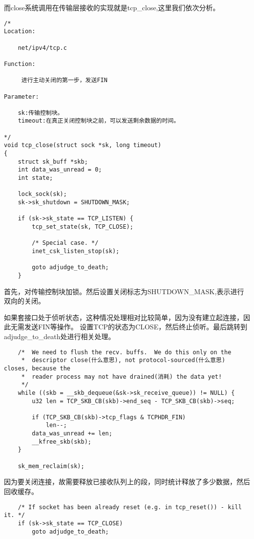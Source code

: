 			而close系统调用在传输层接收的实现就是tcp\_close,这里我们依次分析。
\begin{verbatim}
/*
Location:

    net/ipv4/tcp.c

Function:

     进行主动关闭的第一步，发送FIN   

Parameter:

    sk:传输控制块。
    timeout:在真正关闭控制块之前，可以发送剩余数据的时间。
    
*/
void tcp_close(struct sock *sk, long timeout)
{
    struct sk_buff *skb;
    int data_was_unread = 0;
    int state;

    lock_sock(sk);
    sk->sk_shutdown = SHUTDOWN_MASK;

    if (sk->sk_state == TCP_LISTEN) {
        tcp_set_state(sk, TCP_CLOSE);

        /* Special case. */
        inet_csk_listen_stop(sk);

        goto adjudge_to_death;
    }
\end{verbatim}

        首先，对传输控制块加锁。然后设置关闭标志为SHUTDOWN\_MASK,表示进行双向的关闭。

        如果套接口处于侦听状态，这种情况处理相对比较简单，因为没有建立起连接，因此无需发送FIN等操作。
		设置TCP的状态为CLOSE，然后终止侦听。最后跳转到adjudge\_to\_death处进行相关处理。

\begin{verbatim}
    /*  We need to flush the recv. buffs.  We do this only on the
     *  descriptor close(什么意思), not protocol-sourced(什么意思) closes, because the
     *  reader process may not have drained(消耗) the data yet!
     */
    while ((skb = __skb_dequeue(&sk->sk_receive_queue)) != NULL) {
        u32 len = TCP_SKB_CB(skb)->end_seq - TCP_SKB_CB(skb)->seq;

        if (TCP_SKB_CB(skb)->tcp_flags & TCPHDR_FIN)
            len--;
        data_was_unread += len;
        __kfree_skb(skb);
    }

    sk_mem_reclaim(sk);
\end{verbatim}

        因为要关闭连接，故需要释放已接收队列上的段，同时统计释放了多少数据，然后回收缓存。

\begin{verbatim}
    /* If socket has been already reset (e.g. in tcp_reset()) - kill it. */
    if (sk->sk_state == TCP_CLOSE)
        goto adjudge_to_death;
\end{verbatim}


